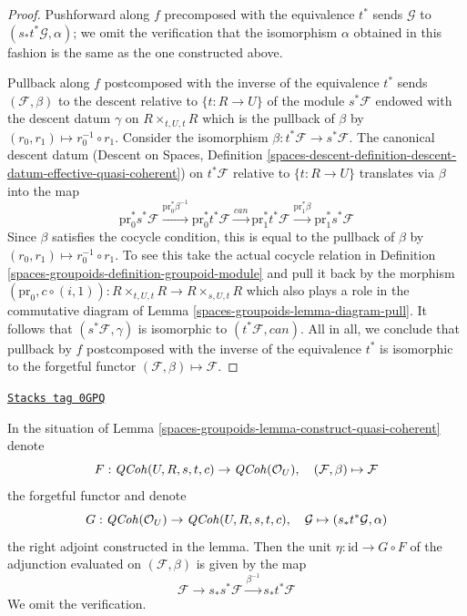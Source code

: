 \begin{proof}
\medskip\noindent
Pushforward along $f$ precomposed with the equivalence $t^*$ sends
$\mathcal{G}$ to $(s_*t^*\mathcal{G}, \alpha)$;
we omit the verification that the isomorphism $\alpha$
obtained in this fashion is the same as the one constructed above.

\medskip\noindent
Pullback along $f$ postcomposed with the inverse of the equivalence $t^*$
sends $(\mathcal{F}, \beta)$ to the descent relative to $\{t : R \to U\}$
of the module $s^*\mathcal{F}$ endowed with the descent datum $\gamma$ on
$R \times_{t, U, t} R$ which is the pullback of $\beta$ by
$(r_0, r_1) \mapsto r_0^{-1} \circ r_1$.
Consider the isomorphism $\beta : t^*\mathcal{F} \to s^*\mathcal{F}$.
The canonical descent datum (Descent on Spaces, Definition
\ref{spaces-descent-definition-descent-datum-effective-quasi-coherent})
on $t^*\mathcal{F}$ relative to $\{t : R \to U\}$
translates via $\beta$ into the map
$$
\text{pr}_0^*s^*\mathcal{F}
\xrightarrow{\text{pr}_0^*\beta^{-1}}
\text{pr}_0^*t^*\mathcal{F}
\xrightarrow{can}
\text{pr}_1^*t^*\mathcal{F}
\xrightarrow{\text{pr}_1^*\beta}
\text{pr}_1^*s^*\mathcal{F}
$$
Since $\beta$ satisfies the cocycle condition, this is equal to the pullback
of $\beta$ by $(r_0, r_1) \mapsto r_0^{-1} \circ r_1$. To see this
take the actual cocycle relation in Definition \ref{spaces-groupoids-definition-groupoid-module}
and pull it back by the morphism
$(\text{pr}_0, c \circ (i, 1)) : R \times_{t, U, t} R \to R \times_{s, U, t} R$
which also plays a role in the commutative diagram of
Lemma \ref{spaces-groupoids-lemma-diagram-pull}. It follows that
$(s^*\mathcal{F}, \gamma)$ is isomorphic to $(t^*\mathcal{F}, can)$.
All in all, we conclude that pullback by $f$ postcomposed with the
inverse of the equivalence $t^*$ is isomorphic to the forgetful functor
$(\mathcal{F}, \beta) \mapsto \mathcal{F}$.
\end{proof}

\begin{remark}
\label{spaces-groupoids-remark-adjunction-map}
\href{https://stacks.math.columbia.edu/tag/0GPQ}{\texttt{Stacks tag 0GPQ}}

In the situation of Lemma \ref{spaces-groupoids-lemma-construct-quasi-coherent} denote
$$
F : \mathit{QCoh}(U, R, s, t, c) \to \mathit{QCoh}(\mathcal{O}_U),\quad
(\mathcal{F}, \beta) \mapsto \mathcal{F}
$$
the forgetful functor and denote
$$
G : \mathit{QCoh}(\mathcal{O}_U) \to \mathit{QCoh}(U, R, s, t, c),\quad
\mathcal{G} \mapsto (s_*t^*\mathcal{G}, \alpha)
$$
the right adjoint constructed in the lemma. Then the unit
$\eta : \text{id} \to G \circ F$ of the adjunction evaluated
on $(\mathcal{F}, \beta)$ is given by the map
$$
\mathcal{F} \to s_*s^*\mathcal{F} \xrightarrow{\beta^{-1}} s_*t^*\mathcal{F}
$$
We omit the verification.
\end{remark}

